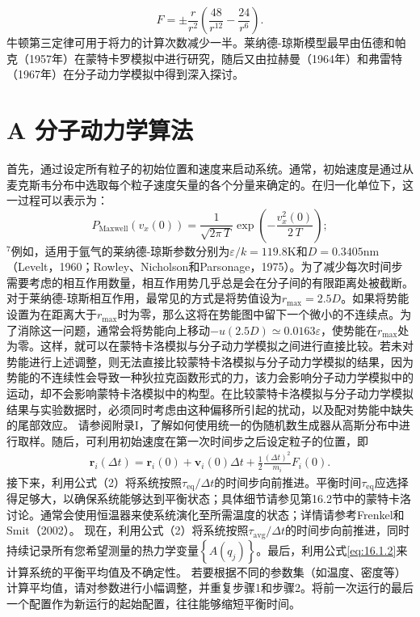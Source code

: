 \begin{equation}\tag{16.2.14}\label{eq:16.2.14}
F = \pm \frac { r } { r ^{2} } \left( \frac { 48 } { r ^{12} } - \frac { 24 } { r ^{6} } \right) .
\end{equation}
牛顿第三定律可用于将力的计算次数减少一半。莱纳德-琼斯模型最早由伍德和帕克（1957年）在蒙特卡罗模拟中进行研究，随后又由拉赫曼（1964年）和弗雷特（1967年）在分子动力学模拟中得到深入探讨。
\section{A 分子动力学算法}\label{a-ux5206ux5b50ux52a8ux529bux5b66ux7b97ux6cd5}
首先，通过设定所有粒子的初始位置和速度来启动系统。通常，初始速度是通过从麦克斯韦分布中选取每个粒子速度矢量的各个分量来确定的。在归一化单位下，这一过程可以表示为：
\begin{equation}\tag{16.3.1}\label{eq:16.3.1}
P _ { \mathrm { M a x w e l l } } ( v _ { x } ( 0 ) ) = \frac { 1 } { \sqrt { 2 \pi \, T } } \exp \left( - \frac { v _ { x } ^{2} ( 0 ) } { 2 \, T } \right) ;
\end{equation}
\(^{7}\)例如，适用于氩气的莱纳德-琼斯参数分别为\(\varepsilon/k=119.8\)K和\(D=0.3405\)nm（Levelt，1960；Rowley、Nicholson和Parsonage，1975）。为了减少每次时间步需要考虑的相互作用数量，相互作用势几乎总是会在分子间的有限距离处被截断。对于莱纳德-琼斯相互作用，最常见的方式是将势值设为\(r_{\mathrm{max}}=2.5D\)。如果将势能设置为在距离大于\(r_{\mathrm{max}}\)时为零，那么这将在势能图中留下一个微小的不连续点。为了消除这一问题，通常会将势能向上移动\(-u(2.5D)\simeq0.0163\varepsilon\)，使势能在\(r_{\mathrm{max}}\)处为零。这样，就可以在蒙特卡洛模拟与分子动力学模拟之间进行直接比较。若未对势能进行上述调整，则无法直接比较蒙特卡洛模拟与分子动力学模拟的结果，因为势能的不连续性会导致一种狄拉克函数形式的力，该力会影响分子动力学模拟中的运动，却不会影响蒙特卡洛模拟中的构型。在比较蒙特卡洛模拟与分子动力学模拟结果与实验数据时，必须同时考虑由这种偏移所引起的扰动，以及配对势能中缺失的尾部效应。
请参阅附录I，了解如何使用统一的伪随机数生成器从高斯分布中进行取样。随后，可利用初始速度在第一次时间步之后设定粒子的位置，即
\begin{equation}\tag{16.3.2}\label{eq:16.3.2}
\begin{array}{r} { \pmb { r } _ { i } ( \Delta t ) = \pmb { r } _ { i } ( 0 ) + \pmb { v } _ { i } ( 0 ) \Delta t + \frac { 1 } { 2 } \frac { ( \Delta t ) ^{2} } { m _ { i } } F _ { i } ( 0 ) . } \end{array}
\end{equation}
接下来，利用公式（2）将系统按照\(\tau_{\mathrm{eq}} / \Delta t\)的时间步向前推进。平衡时间\(\tau_{\mathrm{eq}}\)应选择得足够大，以确保系统能够达到平衡状态；具体细节请参见第16.2节中的蒙特卡洛讨论。通常会使用恒温器来使系统演化至所需温度的状态；详情请参考Frenkel和Smit（2002）。
现在，利用公式（2）将系统按照\(\tau_{\mathrm{avg}} / \Delta t\)的时间步向前推进，同时持续记录所有您希望测量的热力学变量\(\left\{A(q_{j})\right\}\)。最后，利用公式\autoref{eq:16.1.2}来计算系统的平衡平均值及不确定性。
若要根据不同的参数集（如温度、密度等）计算平均值，请对参数进行小幅调整，并重复步骤1和步骤2。将前一次运行的最后一个配置作为新运行的起始配置，往往能够缩短平衡时间。
